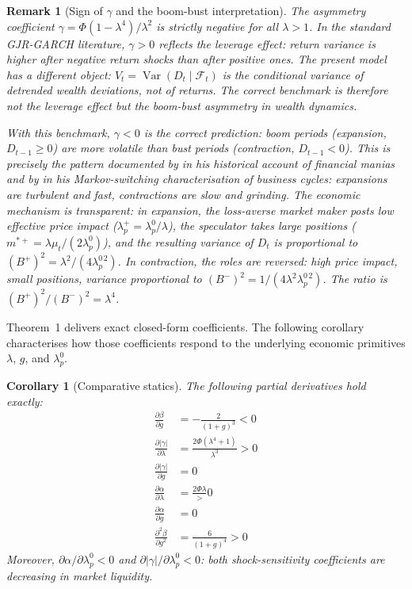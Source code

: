 \documentclass[12pt,a4paper]{article}
\newtheorem{corollary}[theorem]{Corollary}
\newtheorem{remark}[theorem]{Remark}
\theoremstyle{definition}
\begin{document}
\begin{remark}[Sign of $\gamma$ and the boom-bust interpretation]
\label{rem:gamma_sign}
The asymmetry coefficient $\gamma = \Phi(1-\lambda^4)/\lambda^2$ is
strictly negative for all $\lambda > 1$. In the standard GJR-GARCH
literature, $\gamma > 0$ reflects the leverage effect: return variance is
higher after negative return shocks than after positive ones. The present
model has a different object: $V_t = \operatorname{Var}(D_t \mid
\mathcal{F}_t)$ is the conditional variance of \emph{detrended wealth
deviations}, not of returns. The correct benchmark is therefore not the
leverage effect but the boom-bust asymmetry in wealth dynamics.

With this benchmark, $\gamma < 0$ is the \emph{correct} prediction: boom
periods (expansion, $D_{t-1} \geq 0$) are more volatile than bust periods
(contraction, $D_{t-1} < 0$). This is precisely the pattern documented by
\citet{kindleberger1978} in his historical account of financial manias and by
\citet{hamilton1989} in his Markov-switching characterisation of business cycles:
expansions are turbulent and fast, contractions are slow and grinding. The
economic mechanism is transparent: in expansion, the loss-averse market
maker posts \emph{low} effective price impact ($\lambda^+_p =
\lambda^0_p/\lambda$), the speculator takes \emph{large} positions
($m^{*+} = \lambda\mu_t/(2\lambda^0_p)$), and the resulting variance
of $D_t$ is proportional to $(B^+)^2 = \lambda^2/(4\lambda^{0\,2}_p)$.
In contraction, the roles are reversed: high price impact, small positions,
variance proportional to $(B^-)^2 = 1/(4\lambda^2\lambda^{0\,2}_p)$. The
ratio is $(B^+)^2/(B^-)^2 = \lambda^4$.
\end{remark}

\label{sec:comparative_statics}

Theorem~1 delivers exact closed-form coefficients. The following
corollary characterises how those coefficients respond to the
underlying economic primitives $\lambda$, $g$, and $\lambda^0_p$.

\begin{corollary}[Comparative statics]
\label{cor:comp_statics}
The following partial derivatives hold exactly:
\begin{align}
  \frac{\partial\beta}{\partial g}
    &= -\frac{2}{(1+g)^3} < 0
    \label{eq:dbeta_dg} \\
  \frac{\partial|\gamma|}{\partial\lambda}
    &= \frac{2\Phi(\lambda^4+1)}{\lambda^3} > 0
    \label{eq:dgamma_dlam} \\
  \frac{\partial|\gamma|}{\partial g}
    &= 0
    \label{eq:dgamma_dg} \\
  \frac{\partial\alpha}{\partial\lambda}
    &= \frac{2\Phi\lambda} > 0
    \label{eq:dalpha_dlam} \\
  \frac{\partial\alpha}{\partial g}
    &= 0
    \label{eq:dalpha_dg} \\
  \frac{\partial^2\beta}{\partial g^2}
    &= \frac{6}{(1+g)^4} > 0
    \label{eq:d2beta_dg2}
\end{align}
Moreover, $\partial\alpha/\partial\lambda^0_p < 0$ and
$\partial|\gamma|/\partial\lambda^0_p < 0$: both shock-sensitivity
coefficients are decreasing in market liquidity.
\end{corollary}
\end{document}
